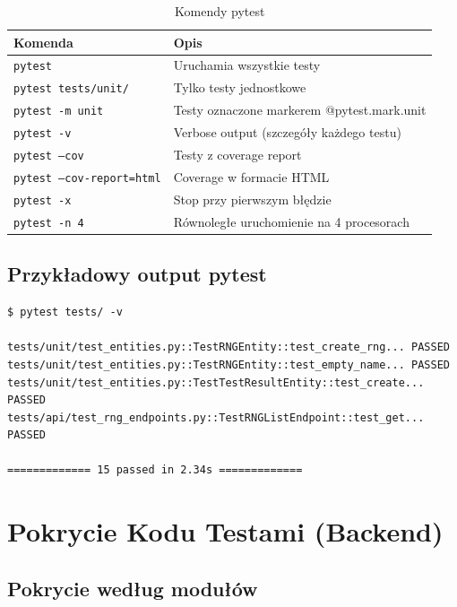 \documentclass[12pt,a4paper]{article}
\begin{document}
\begin{table}[H]
\centering
\caption{Komendy pytest}
\begin{tabular}{|l|p{8cm}|}
\hline
\textbf{Komenda} & \textbf{Opis} \\
\hline
\texttt{pytest} & Uruchamia wszystkie testy \\
\hline
\texttt{pytest tests/unit/} & Tylko testy jednostkowe \\
\hline
\texttt{pytest -m unit} & Testy oznaczone markerem @pytest.mark.unit \\
\hline
\texttt{pytest -v} & Verbose output (szczegóły każdego testu) \\
\hline
\texttt{pytest --cov} & Testy z coverage report \\
\hline
\texttt{pytest --cov-report=html} & Coverage w formacie HTML \\
\hline
\texttt{pytest -x} & Stop przy pierwszym błędzie \\
\hline
\texttt{pytest -n 4} & Równoległe uruchomienie na 4 procesorach \\
\hline
\end{tabular}
\end{table}

\subsection{Przykładowy output pytest}

\begin{lstlisting}[basicstyle=\ttfamily\footnotesize]
$ pytest tests/ -v

tests/unit/test_entities.py::TestRNGEntity::test_create_rng... PASSED
tests/unit/test_entities.py::TestRNGEntity::test_empty_name... PASSED
tests/unit/test_entities.py::TestTestResultEntity::test_create... PASSED
tests/api/test_rng_endpoints.py::TestRNGListEndpoint::test_get... PASSED

============= 15 passed in 2.34s =============
\end{lstlisting}

\newpage

\section{Pokrycie Kodu Testami (Backend)}

\subsection{Pokrycie według modułów}
\end{document}
